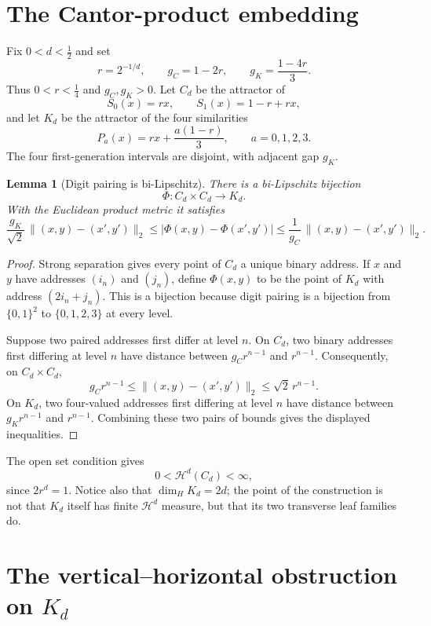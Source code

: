 \documentclass[11pt]{article}
\newtheorem{lemma}{Lemma}
\newcommand{\Hh}{\mathcal{H}}
\begin{document}
\section*{The Cantor-product embedding}

Fix $0<d<\frac12$ and set
\[
 r=2^{-1/d},\qquad g_C=1-2r,\qquad g_K=\frac{1-4r}{3}.
\]
Thus $0<r<\frac14$ and $g_C,g_K>0$.  Let $C_d$ be the attractor of
\[
 S_0(x)=rx,\qquad S_1(x)=1-r+rx,
\]
and let $K_d$ be the attractor of the four similarities
\[
 P_a(x)=rx+\frac{a(1-r)}3,\qquad a=0,1,2,3.
\]
The four first-generation intervals are disjoint, with adjacent gap $g_K$.

\begin{lemma}[Digit pairing is bi-Lipschitz]\label{lem:bilip}
There is a bi-Lipschitz bijection
\[
 \Phi:C_d\times C_d\longrightarrow K_d.
\]
With the Euclidean product metric it satisfies
\[
 \frac{g_K}{\sqrt2}\,\|(x,y)-(x',y')\|_2
 \leq |\Phi(x,y)-\Phi(x',y')|
 \leq \frac1{g_C}\,\|(x,y)-(x',y')\|_2.
\]
\end{lemma}

\begin{proof}
Strong separation gives every point of $C_d$ a unique binary address.  If
$x$ and $y$ have addresses $(i_n)$ and $(j_n)$, define $\Phi(x,y)$ to be the
point of $K_d$ with address $(2i_n+j_n)$.  This is a bijection because digit
pairing is a bijection from $\{0,1\}^2$ to $\{0,1,2,3\}$ at every level.

Suppose two paired addresses first differ at level $n$.  On $C_d$, two
binary addresses first differing at level $n$ have distance between
$g_Cr^{n-1}$ and $r^{n-1}$.  Consequently, on $C_d\times C_d$,
\[
 g_Cr^{n-1}\leq \|(x,y)-(x',y')\|_2
 \leq \sqrt2\,r^{n-1}.
\]
On $K_d$, two four-valued addresses first differing at level $n$ have
distance between $g_Kr^{n-1}$ and $r^{n-1}$.  Combining these two pairs of
bounds gives the displayed inequalities.
\end{proof}

The open set condition gives
\begin{equation}\label{eq:cmeasure}
 0<\Hh^d(C_d)<\infty,
\end{equation}
since $2r^d=1$.  Notice also that $\dim_H K_d=2d$; the point of the
construction is not that $K_d$ itself has finite $\Hh^d$ measure, but that
its two transverse leaf families do.

\section*{The vertical--horizontal obstruction on $K_d$}
\end{document}
